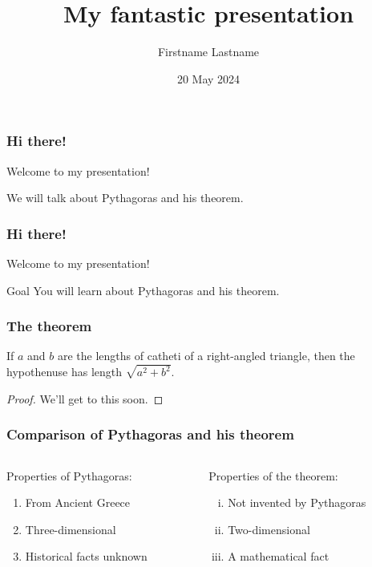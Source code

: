 \documentclass{beamer}
\title{My fantastic presentation}
\author{Firstname Lastname}
\institute{University of Puuhamaa}
\date{20 May 2024}
\begin{document}
\maketitle


\begin{frame}
\frametitle{Hi there!}

Welcome to my presentation!

We will talk about Pythagoras and his theorem.
\end{frame}


\begin{frame}
\frametitle{Hi there!}

Welcome to my presentation!

\begin{block}{Goal}
You will learn about Pythagoras and his theorem.
\end{block}
\end{frame}


\begin{frame}
\frametitle{The theorem}

\begin{theorem}
If $a$ and $b$ are the lengths of catheti of a right-angled triangle,
then the hypothenuse has length $\sqrt{a^2 + b^2}$.
\end{theorem}
\begin{proof}
We'll get to this soon.
\end{proof}

\end{frame}


\begin{frame}
\frametitle{Comparison of Pythagoras and his theorem}

\begin{columns}
\begin{column}{0.5\textwidth}

Properties of \alert{Pythagoras}:
\begin{enumerate}[1.]
    \item From Ancient Greece
    \item Three-dimensional
    \item Historical facts unknown
\end{enumerate}

\end{column}

\begin{column}{0.5\textwidth}

Properties of \alert{the theorem}:
\begin{enumerate}[i)]
    \item Not invented by Pythagoras
    \item Two-dimensional
    \item A mathematical fact
\end{enumerate}

\end{column}
\end{columns}

\end{frame}
\end{document}
